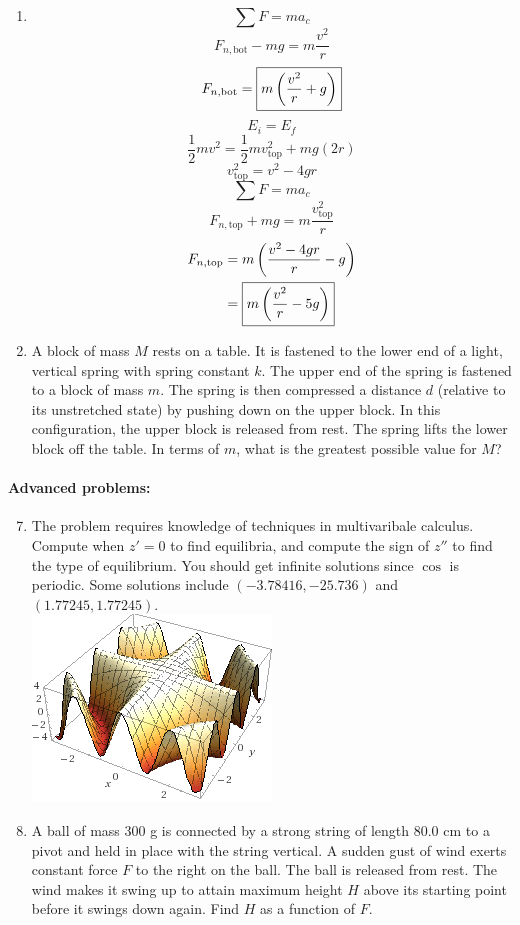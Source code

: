 \documentclass[12pt,letterpaper]{article}
\begin{document}
\begin{multicols}{2}
\begin{enumerate}
\item
$$\sum F = ma_c$$
$$F_{n,\text{bot}}-mg=m\frac{v^2}{r}$$
$$F_{n,\text{bot}} = \fbox{$\displaystyle m\left(\frac{v^2}{r}+g\right)$}$$
$$E_i=E_f$$
$$\frac{1}{2}mv^2=\frac{1}{2}mv_{\text{top}}^2+mg\left(2r\right)$$
$$v_{\text{top}}^2=v^2-4gr$$
$$\sum F = ma_c$$
$$F_{n,\text{top}}+mg=m\frac{v_{\text{top}}^2}{r}$$
\[
\begin{aligned}
F_{n,\text{top}} &= m\left(\frac{v^2-4gr}{r}-g\right)\\
&= \fbox{$\displaystyle m\left(\frac{v^2}{r}-5g\right)$}
\end{aligned}
\]

\item
A block of mass $M$ rests on a table. It is fastened to the lower end of a light, vertical spring with spring constant $k$. The upper end of the spring is fastened to a block of mass $m$. The spring is then compressed a distance $d$ (relative to its unstretched state) by pushing down on the upper block. In this configuration, the upper block is released from rest. The spring lifts the lower block off the table. In terms of $m$, what is the greatest possible value for $M$?
\end{enumerate}
\paragraph{Advanced problems:}
\begin{enumerate}
\setcounter{enumi}{6}
\item The problem requires knowledge of techniques in multivaribale calculus. Compute when $z' = 0$ to find equilibria, and compute the sign of $z''$ to find the type of equilibrium. You should get infinite solutions since $\cos$ is periodic. Some solutions include $(-3.78416, -25.736)$ and $(1.77245, 1.77245)$.\\
\includegraphics[width=2.5in]{3-7.png}
\item
A ball of mass 300 g is connected by a strong string of length 80.0 cm to a pivot and held in place with the string vertical. A sudden gust of wind exerts constant force $F$ to the right on the ball. The ball is released from rest. The wind makes it swing up to attain maximum height $H$ above its starting point before it swings down again. Find $H$ as a function of $F$.


\end{enumerate}
\end{multicols}
\end{document}
